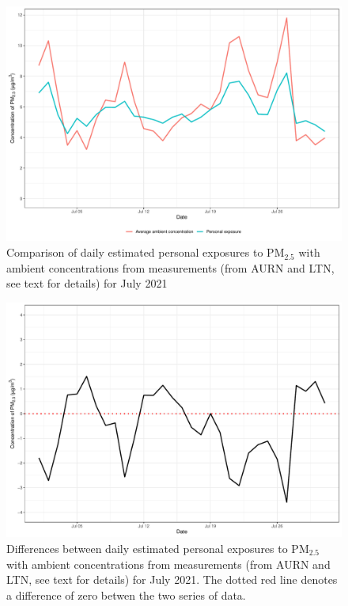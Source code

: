 \documentclass{article}
\begin{document}
\begin{figure}[!hbtp]
	\centering
	\includegraphics[width=0.85\linewidth]{Figures/Fig2a}		
	\caption{Comparison of daily estimated personal exposures to PM$_{2.5}$ with ambient concentrations from measurements (from AURN and LTN, see text for details) for July 2021} \label{fig::Fig2a}
\end{figure}
\begin{figure}[!hbtp]
	\centering
	\includegraphics[width=0.85\linewidth]{Figures/Fig2a_diff}		
	\caption{Differences between daily estimated personal exposures to PM$_{2.5}$ with ambient concentrations from measurements (from AURN and LTN, see text for details) for July 2021. The dotted red line denotes a difference of zero betwen the two series of data. } \label{fig::Fig2a_diff}
\end{figure}
\end{document}
